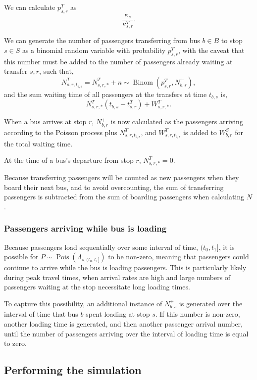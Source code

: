 \documentclass[12pt]{article}
\theoremstyle{definition}
\DeclareMathOperator{\Pois}{Pois}
\DeclareMathOperator{\Binom}{Binom}
\begin{document}
We can calculate $p^T_{s,r}$ as
\[
    \frac{\kappa_s}{\kappa^T_{s,r}}.
\]

We can generate the number of passengers transferring from bus $b \in B$ to
stop $s \in S$ as a binomial random variable with probability $p^T_{s,r}$,
with the caveat that this number must be added to the number of passengers
already waiting at transfer $s,r$, such that,
\[
    N^T_{s,r,t_{b,s}} = N^T_{s,r,*} + n \sim \Binom(p^T_{s,r}, N^+_{b,s}),
\]
and the sum waiting time of all passengers at the transfers at time $t_{b,s}$
is,
\[
    N^T_{s,r,*}(t_{b,s} - t^T_{s,r}) + W^T_{s,r,*}.
\]

When a bus arrives at stop $r$, $N^+_{b,r}$ is now calculated as the
passengers arriving according to the Poisson process plus $N^T_{s,r,t_{b,r}}$,
and $W^T_{s,r,t_{b,r}}$ is added to $W^S_{b,r}$ for the total waiting time.

At the time of a bus's departure from stop $r$, $N^T_{s,r,*} = 0$.

Because transferring passengers will be counted as new passengers when they
board their next bus, and to avoid overcounting, the sum of transferring
passengers is subtracted from the sum of boarding passengers when calculating
$N$.

\subsubsection{Passengers arriving while bus is loading}

Because passengers load sequentially over some interval of time, $(t_0, t_1]$,
it is possible for $P \sim \Pois(\Lambda_{s,(t_0,t_1]})$ to be non-zero,
meaning that passengers could continue to arrive while the bus is loading
passengers. This is particularly likely during peak travel times, when arrival
rates are high and large numbers of passengers waiting at the stop necessitate
long loading times.

To capture this possibility, an additional instance of $N^+_{b,s}$ is
generated over the interval of time that bus $b$ spent loading at stop $s$.
If this number is non-zero, another loading time is generated, and then
another passenger arrival number, until the number of passengers arriving over
the interval of loading time is equal to zero.

\subsection{Performing the simulation}
\label{sec:simulation}
\end{document}

